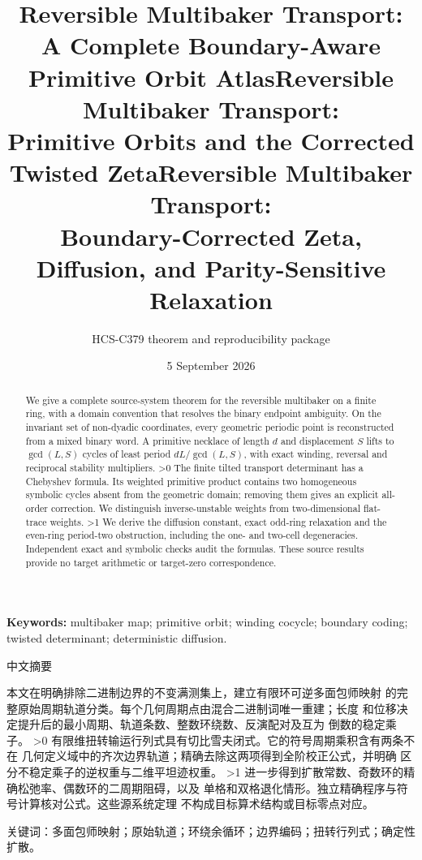 \documentclass[10pt]{article}
\title{Reversible Multibaker Transport:\\A Complete Boundary-Aware Primitive Orbit Atlas}
\title{Reversible Multibaker Transport:\\Primitive Orbits and the Corrected Twisted Zeta}
\title{Reversible Multibaker Transport:\\Boundary-Corrected Zeta, Diffusion, and Parity-Sensitive Relaxation}
\author{HCS-C379 theorem and reproducibility package}
\date{5 September 2026}
\begin{document}
\maketitle
\begin{abstract}
We give a complete source-system theorem for the reversible multibaker on a
finite ring, with a domain convention that resolves the binary endpoint
ambiguity. On the invariant set of non-dyadic coordinates, every geometric
periodic point is reconstructed from a mixed binary word. A primitive
necklace of length $d$ and displacement $S$ lifts to $\gcd(L,S)$ cycles of
least period $dL/\gcd(L,S)$, with exact winding, reversal and reciprocal
stability multipliers.
\ifnum\CRevisionRound>0
The finite tilted transport determinant has a Chebyshev formula. Its weighted
primitive product contains two homogeneous symbolic cycles absent from the
geometric domain; removing them gives an explicit all-order correction.
We distinguish inverse-unstable weights from two-dimensional flat-trace
weights.
\fi
\ifnum\CRevisionRound>1
We derive the diffusion constant, exact odd-ring relaxation and the even-ring
period-two obstruction, including the one- and two-cell degeneracies.
Independent exact and symbolic checks audit the formulas. These source
results provide no target arithmetic or target-zero correspondence.
\fi
\end{abstract}
\noindent\textbf{Keywords:} multibaker map; primitive orbit; winding cocycle;
boundary coding; twisted determinant; deterministic diffusion.
\begin{otherlanguage}{chinese-simplified}
\begin{center}{\large 中文摘要}\end{center}
\begin{sloppypar}
本文在明确排除二进制边界的不变满测集上，建立有限环可逆多面包师映射
的完整原始周期轨道分类。每个几何周期点由混合二进制词唯一重建；长度
和位移决定提升后的最小周期、轨道条数、整数环绕数、反演配对及互为
倒数的稳定乘子。
\ifnum\CRevisionRound>0
有限维扭转输运行列式具有切比雪夫闭式。它的符号周期乘积含有两条不在
几何定义域中的齐次边界轨道；精确去除这两项得到全阶校正公式，并明确
区分不稳定乘子的逆权重与二维平坦迹权重。
\fi
\ifnum\CRevisionRound>1
进一步得到扩散常数、奇数环的精确松弛率、偶数环的二周期阻碍，以及
单格和双格退化情形。独立精确程序与符号计算核对公式。这些源系统定理
不构成目标算术结构或目标零点对应。
\fi
\end{sloppypar}
\noindent 关键词：多面包师映射；原始轨道；环绕余循环；边界编码；扭转行列式；确定性扩散。
\end{otherlanguage}
\end{document}
